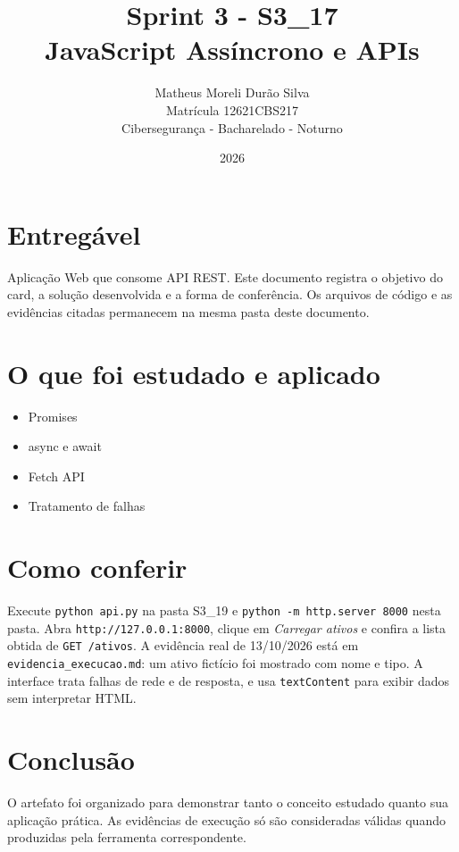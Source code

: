 \documentclass[12pt]{article}
\title{Sprint 3 - S3\_17\\JavaScript Assíncrono e APIs}
\author{Matheus Moreli Durão Silva\\Matrícula 12621CBS217\\Cibersegurança - Bacharelado - Noturno}
\date{2026}
\begin{document}
\maketitle

\section*{Entregável}
Aplicação Web que consome API REST. Este documento registra o objetivo do card, a solução desenvolvida e a forma de conferência. Os arquivos de código e as evidências citadas permanecem na mesma pasta deste documento.

\section*{O que foi estudado e aplicado}
\begin{itemize}
\item Promises
\item async e await
\item Fetch API
\item Tratamento de falhas
\end{itemize}

\section*{Como conferir}
Execute \texttt{python api.py} na pasta S3\_19 e \texttt{python -m http.server 8000} nesta pasta. Abra \texttt{http://127.0.0.1:8000}, clique em \textit{Carregar ativos} e confira a lista obtida de \texttt{GET /ativos}. A evidência real de 13/10/2026 está em \texttt{evidencia\_execucao.md}: um ativo fictício foi mostrado com nome e tipo. A interface trata falhas de rede e de resposta, e usa \texttt{textContent} para exibir dados sem interpretar HTML.

\section*{Conclusão}
O artefato foi organizado para demonstrar tanto o conceito estudado quanto sua aplicação prática. As evidências de execução só são consideradas válidas quando produzidas pela ferramenta correspondente.
\end{document}
